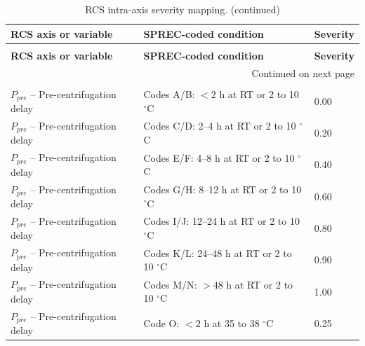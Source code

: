 \documentclass[preprint,12pt]{elsarticle}
\begin{document}
\footnotesize
\begin{longtable}{@{}p{3.0cm}p{8.2cm}p{1.2cm}@{}}
\caption{RCS intra-axis severity mapping.}
\label{supp:rcs_intra_axis_severity}\\

\toprule
\textbf{RCS axis or variable} & \textbf{SPREC-coded condition} & \textbf{Severity} \\
\midrule
\endfirsthead

\caption[]{RCS intra-axis severity mapping. (continued)}\\
\toprule
\textbf{RCS axis or variable} & \textbf{SPREC-coded condition} & \textbf{Severity} \\
\midrule
\endhead

\midrule
\multicolumn{3}{r}{\footnotesize Continued on next page} \\
\endfoot

\bottomrule
\endlastfoot

\multicolumn{3}{@{}l}{\textbf{Fluid biospecimens}} \\
\midrule

\(P_{pre}\) -- Pre-centrifugation delay
& Codes A/B: \(<2\) h at RT or 2 to 10 \(^{\circ}\)C
& 0.00 \\

\(P_{pre}\) -- Pre-centrifugation delay
& Codes C/D: 2--4 h at RT or 2 to 10 \(^{\circ}\)C
& 0.20 \\

\(P_{pre}\) -- Pre-centrifugation delay
& Codes E/F: 4--8 h at RT or 2 to 10 \(^{\circ}\)C
& 0.40 \\

\(P_{pre}\) -- Pre-centrifugation delay
& Codes G/H: 8--12 h at RT or 2 to 10 \(^{\circ}\)C
& 0.60 \\

\(P_{pre}\) -- Pre-centrifugation delay
& Codes I/J: 12--24 h at RT or 2 to 10 \(^{\circ}\)C
& 0.80 \\

\(P_{pre}\) -- Pre-centrifugation delay
& Codes K/L: 24--48 h at RT or 2 to 10 \(^{\circ}\)C
& 0.90 \\

\(P_{pre}\) -- Pre-centrifugation delay
& Codes M/N: \(>48\) h at RT or 2 to 10 \(^{\circ}\)C
& 1.00 \\

\(P_{pre}\) -- Pre-centrifugation delay
& Code O: \(<2\) h at 35 to 38 \(^{\circ}\)C
& 0.25 \\

\midrule


\end{longtable}
\end{document}
